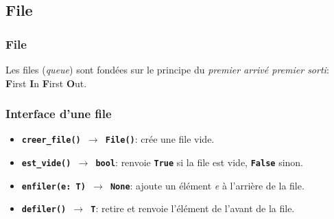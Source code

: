 \documentclass[svgnames,11pt]{beamer}
\begin{document}
\subsection{File}
\begin{frame}
    \frametitle{File}

    \begin{aretenir}[]
        Les files (\emph{queue}) sont fondées sur le principe du \emph{premier arrivé premier sorti}: \textbf{F}irst \textbf{I}n \textbf{F}irst \textbf{O}ut.
    \end{aretenir}

\end{frame}
\begin{frame}
    \frametitle{}

   \begin{center}
   \end{center} 

\end{frame}
\begin{frame}
    \frametitle{Interface d'une file}

    \begin{itemize}
        \item \texttt{\textbf{creer\_file() $\rightarrow$ File()}}: crée une file vide.
        \item \texttt{\textbf{est\_vide() $\rightarrow$ bool}}: renvoie \textbf{\texttt{True}} si la file est vide, \textbf{\texttt{False}} sinon.
        \item \texttt{\textbf{enfiler(e: T) $\rightarrow$ None}}: ajoute un élément \emph{e} à l'arrière de la file.
        \item \texttt{\textbf{defiler() $\rightarrow$ T}}: retire et renvoie l'élément de l'avant de la file.
        \end{itemize}

\end{frame}
\end{document}
